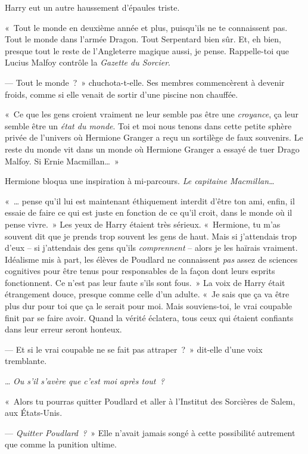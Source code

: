 Harry eut un autre haussement d'épaules triste.

«~Tout le monde en deuxième année et plus, puisqu'ils ne te connaissent pas.
Tout le monde dans l'armée Dragon.
Tout Serpentard bien sûr.
Et, eh bien, presque tout le reste de l'Angleterre magique aussi, je pense.
Rappelle-toi que Lucius Malfoy contrôle la \emph{Gazette du Sorcier}.

--- Tout le monde~?~»
chuchota-t-elle.
Ses membres commencèrent à devenir froids, comme si elle venait de sortir d'une piscine non chauffée.

«~Ce que les gens croient vraiment ne leur semble pas être une \emph{croyance}, ça leur semble être un \emph{état du monde}.
Toi et moi nous tenons dans cette petite sphère privée de l'univers où Hermione Granger a reçu un sortilège de faux souvenirs.
Le reste du monde vit dans un monde où Hermione Granger a essayé de tuer Drago Malfoy.
Si Ernie Macmillan…~»

Hermione bloqua une inspiration à mi-parcours.
\emph{Le capitaine Macmillan…}

«~… pense qu'il lui est maintenant éthiquement interdit d'être ton ami, enfin, il essaie de faire ce qui est juste en fonction de ce qu'il croit, dans le monde où il pense vivre.~»
Les yeux de Harry étaient très sérieux.
«~Hermione, tu m'as souvent dit que je prends trop souvent les gens de haut.
Mais si j'attendais trop d'eux -- si j'attendais des gens qu'ils \emph{comprennent} -- alors je les haïrais vraiment.
Idéalisme mis à part, les élèves de Poudlard ne connaissent \emph{pas} assez de sciences cognitives pour être tenus pour responsables de la façon dont leurs esprits fonctionnent.
Ce n'est pas leur faute s'ils sont fous.~»
La voix de Harry était étrangement douce, presque comme celle d'un adulte.
«~Je sais que ça va être plus dur pour toi que ça le serait pour moi.
Mais souviens-toi, le vrai coupable finit par se faire avoir.
Quand la vérité éclatera, tous ceux qui étaient confiants dans leur erreur seront honteux.

--- Et si le vrai coupable ne se fait pas attraper~?~»
dit-elle d'une voix tremblante.

… \emph{Ou s'il s'avère que c'est moi après tout~?}

«~Alors tu pourras quitter Poudlard et aller à l'Institut des Sorcières de Salem, aux États-Unis.

--- \emph{Quitter Poudlard~?}~» Elle n'avait jamais songé à cette possibilité autrement que comme la punition ultime.

